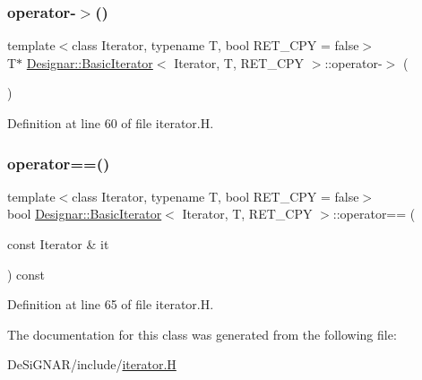 \subsubsection{\texorpdfstring{operator-\/$>$()}{operator->()}}
{\footnotesize\ttfamily template$<$class Iterator, typename T, bool R\+E\+T\+\_\+\+C\+PY = false$>$ \\
T$\ast$ \hyperlink{class_designar_1_1_basic_iterator}{Designar\+::\+Basic\+Iterator}$<$ Iterator, T, R\+E\+T\+\_\+\+C\+PY $>$\+::operator-\/$>$ (\begin{DoxyParamCaption}{ }\end{DoxyParamCaption})\hspace{0.3cm}{\ttfamily [inline]}}



Definition at line 60 of file iterator.\+H.

\mbox{\label{class_designar_1_1_basic_iterator_abaca601c4d1d4ff27429426437abbf02}} 
\subsubsection{\texorpdfstring{operator==()}{operator==()}}
{\footnotesize\ttfamily template$<$class Iterator, typename T, bool R\+E\+T\+\_\+\+C\+PY = false$>$ \\
bool \hyperlink{class_designar_1_1_basic_iterator}{Designar\+::\+Basic\+Iterator}$<$ Iterator, T, R\+E\+T\+\_\+\+C\+PY $>$\+::operator== (\begin{DoxyParamCaption}\item[{const Iterator \&}]{it }\end{DoxyParamCaption}) const\hspace{0.3cm}{\ttfamily [inline]}}



Definition at line 65 of file iterator.\+H.



The documentation for this class was generated from the following file\+:\begin{DoxyCompactItemize}
\item 
De\+Si\+G\+N\+A\+R/include/\hyperlink{iterator_8_h}{iterator.\+H}\end{DoxyCompactItemize}
